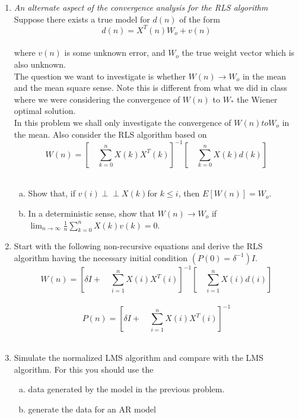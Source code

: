 \documentclass[journal,12pt,twocolumn]{IEEEtran}
\begin{document}
\section{}
\begin{enumerate}
\item \textit{An alternate aspect of the convergence analysis for the RLS algorithm}\\
Suppose there exists a true model for $d(n)$ of the form\\
$$d(n)=X^T(n)W_o+v(n)$$\\
where $v(n)$ is some unknown error, and $W_o$ the true weight vector which is also unknown.\\
\medskip
The question we want to investigate is whether $W(n)\rightarrow {W}_o$ in the mean and the mean square sense. Note this is different from what we did in class where we were considering the convergence of $W(n)$ to $W_*$ the Wiener optimal
solution.\\
\medskip
In this problem we shall only investigate the convergence of $W(n) to W_o$ in the mean. Also consider the RLS
algorithm based on
$$W(n)=[\quad\sum_{k=0}^{n}X(k)X^T(k)]^{-1}[\quad\sum_{k=0}^{n}X(k)d(k)]$$\\
\begin{enumerate}[(a)]
\item Show that, if ${v(i)}\perp\!\!\!\perp{X(k)}$for $k \leq i$, then $E[W(n)] = W_{o}.$\\
\medskip
\item In a deterministic sense, show that $W(n)\rightarrow W_o$ if $\lim_{n\to\infty}\frac{1}{n}\sum_{k=0}^{n}X(k)v(k)=0.$\\
\end{enumerate}
\item Start with the following non-recursive equations and derive the RLS algorithm having the necessary initial condition $(P(0)=\delta^{-1})I.$\\
$$W(n)=[\delta I+\quad\sum_{i=1}^{n}X(i) X^T(i)]^{-1}[\quad\sum_{i=1}^{n}X(i)d(i)]$$\\
$$P(n)=[\delta I+\quad\sum_{i=1}^{n}X(i)X^T(i)]^{-1}$$\\
\item Simulate the normalized LMS algorithm and compare with the LMS algorithm. For this you should use the 
\begin{enumerate}[(a)]
\item data generated by the model in the previous problem.
\item generate the data for an AR model\\

\end{enumerate}
\end{enumerate}
\end{document}
